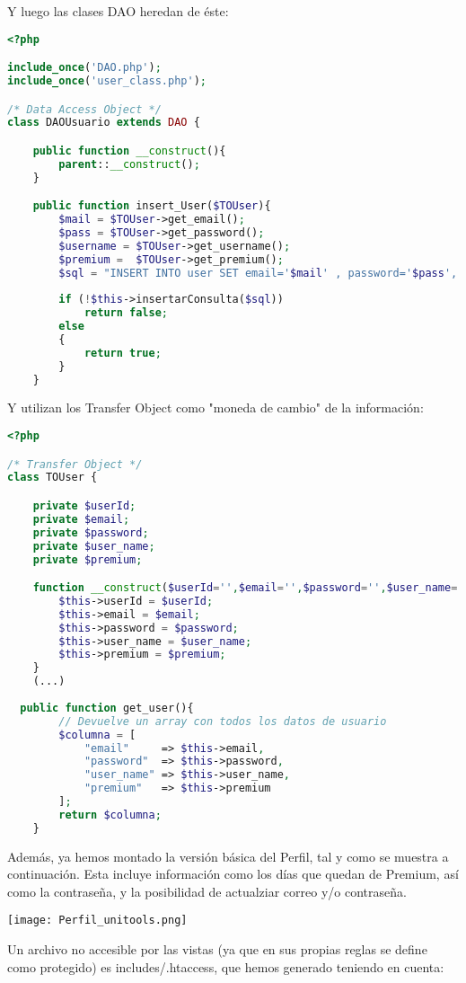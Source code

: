 \documentclass[12pt]{report}
\begin{document}
Y luego las clases DAO heredan de éste:
\newline
\begin{lstlisting}[language=PHP]
<?php

include_once('DAO.php');
include_once('user_class.php');

/* Data Access Object */
class DAOUsuario extends DAO {

	public function __construct(){
		parent::__construct();
	}

	public function insert_User($TOUser){
		$mail = $TOUser->get_email();
        $pass = $TOUser->get_password();
        $username = $TOUser->get_username();
        $premium =  $TOUser->get_premium();
		$sql = "INSERT INTO user SET email='$mail' , password='$pass', username='$username', premium='$premium'";
		
		if (!$this->insertarConsulta($sql))
			return false;
		else 
		{
			return true;
		}
	}
\end{lstlisting}

Y utilizan los Transfer Object como "moneda de cambio" de la información:
\newline
\begin{lstlisting}[language=PHP]
<?php

/* Transfer Object */
class TOUser {

	private $userId;
	private $email;
	private $password;
	private $user_name;
	private $premium;

	function __construct($userId='',$email='',$password='',$user_name='',$premium=''){
		$this->userId = $userId;
		$this->email = $email;
		$this->password = $password;
		$this->user_name = $user_name;
		$this->premium = $premium;
	}
	(...)
	
  public function get_user(){
		// Devuelve un array con todos los datos de usuario
		$columna = [
		    "email"     => $this->email,
		    "password"  => $this->password,
		    "user_name" => $this->user_name,
		    "premium"   => $this->premium
		];
		return $columna;
	}
\end{lstlisting}
Además, ya hemos montado la versión básica del Perfil, tal y como se muestra a continuación. Esta incluye información como los días que quedan de Premium, así como la contraseña, y la posibilidad de actualziar correo y/o contraseña.
\newline

\texttt{[image: Perfil\_unitools.png]}

Un archivo no accesible por las vistas (ya que en sus propias reglas se define como protegido) es includes/.htaccess, que hemos generado teniendo en cuenta:
\end{document}
